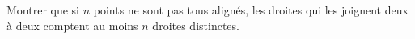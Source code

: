 Montrer que si $n$ points ne sont pas tous alignés, les droites qui les joignent deux à deux comptent au moins $n$ droites distinctes.
